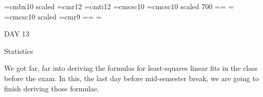 
\def\folio{\ifnum\pageno>0 \number\pageno \else
   \ifnum\pageno<0 \romannumeral-\pageno \else\fi\fi}

\font\largebf=cmbx10  scaled 
\font\largerm=cmr12
\font\largeit=cmti12
\font\tensc=cmcsc10
\font\sevensc=cmcsc10 scaled 700
\newfam\scfam \def\sc{\fam\scfam\tensc}
\textfont\scfam=\tensc \scriptfont\scfam=\sevensc
\scriptscriptfont\scfam=\sevensc
\font\largesc=cmcsc10 scaled 
\font\ninerm=cmr9
\newfam\srfam \def\sr{\fam\srfam\ninerm}
\textfont\srfam=\ninerm \scriptfont\srfam=\sevenrm
\scriptscriptfont\srfam=\fiverm




\null\vskip36pt

\centerline{\largerm DAY 13}
\nobreak\bigskip

\centerline{\largeit Statistics}
\nobreak\bigskip

\bigskip

\nobreak\bigskip

We got far, far into deriving the formulas for least-squares linear fits in the class before the exam. In this, the last day before mid-semester break, we are going to finish deriving those formulae.

\bigskip

\bye
